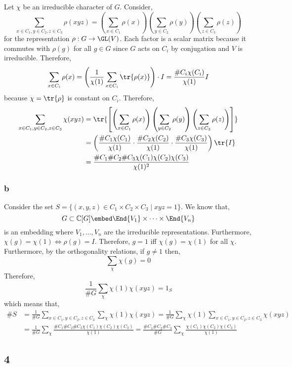 \documentclass[12pt]{article}
\renewcommand{\C}{\mathbb{C}}
\begin{document}
Let $\chi$ be an irreducible character of $G$. Consider,
\[ \sum_{x \in C_1, y \in C_2, z \in C_3} \rho(xyz) = \left( \sum_{x \in C_1} \rho(x) \right) \left( \sum_{y \in C_2} \rho(y) \right) \left( \sum_{z \in C_3} \rho(z) \right) \]
for the representation $\rho : G \to \GL(V)$. Each factor is a scalar matrix because it commutes with $\rho(g)$ for all $g \in G$ since $G$ acts on $C_i$ by conjugation and $V$ is irreducible. Therefore,
\[ \sum_{x \in C_i} \rho(x) = \left( \frac{1}{\chi(1)} \sum_{x \in C_i} \tr{\rho(x)} \right) \cdot I = \frac{\# C_i \chi(C_i)}{\chi(1)} I \]
because $\chi = \tr{\rho}$ is constant on $C_i$.
Therefore,
\begin{align*}
 \sum_{x \in C_1, y \in C_2, z \in C_3} \chi(xyz) & = \tr{ \left[ \left( \sum_{x \in C_1} \rho(x) \right) \left( \sum_{y \in C_2} \rho(y) \right) \left( \sum_{z \in C_3} \rho(z) \right) \right]} 
\\
& = \left( \frac{\# C_1 \chi(C_1)}{\chi(1)} \cdot \frac{\# C_2 \chi(C_2)}{\chi(1)} \cdot \frac{\# C_3 \chi(C_3)}{\chi(1)} \right) \tr{I}
\\
& = \frac{\# C_1 \# C_2 \# C_3 \chi(C_1) \chi(C_2) \chi(C_3)}{\chi(1)^2}
\end{align*}

\subsubsection{b}

Consider the set $S = \{ (x,y,z) \in C_1 \times C_2 \times C_3 \mid xyz = 1 \}$. We know that,
\[ G \subset \C[G] \embed \End{V_1} \times \cdots \times \End{V_n} \]
is an embedding where $V_1, \dots, V_n$ are the irreducible representations. Furthermore, $\chi(g) = \chi(1) \iff \rho(g) = I$. Therefore, $g = 1$ iff $\chi(g) = \chi(1)$ for all $\chi$. Furthermore, by the orthogonality relations, if $g \neq 1$ then,
\[ \sum_{\chi} \chi(g) = 0 \]
Therefore, 
\[ \frac{1}{\# G} \sum_{\chi} \chi(1) \chi(xyz) = 1_S \]
which means that,
\begin{align*}
\# S & = \frac{1}{\# G} \sum_{x \in C_1, y \in C_2, z \in C_3} \sum_{\chi} \chi(1) \chi(xyz) = \frac{1}{\#G} \sum_{\chi} \chi(1) \sum_{x \in C_1, y \in C_2, z \in C_3} \chi(xyz)
\\
& = \frac{1}{\# G} \sum_{\chi} \frac{\# C_1 \# C_2 \# C_3 \chi(C_1) \chi(C_2) \chi(C_3)}{\chi(1)} = \frac{\# C_1 \# C_2 \# C_3}{\# G} \sum_{\chi} \frac{\chi(C_1) \chi(C_2) \chi(C_3)}{\chi(1)} 
\end{align*}

\subsection{4}
\end{document}

